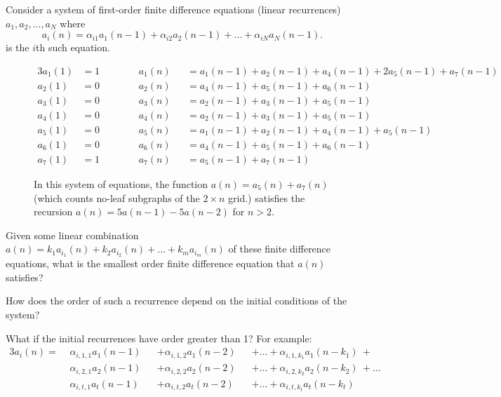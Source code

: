 \documentclass{article}
\begin{document}
Consider a system of first-order finite difference equations (linear recurrences)
$a_1, a_2, \hdots, a_N$ where \[
  a_i(n) = \alpha_{i1}a_1(n - 1) + \alpha_{i2}a_2(n - 1) + \hdots + \alpha_{iN}a_N(n - 1).
\] is the $i$th such equation.
%
\begin{figure}[ht!]
  \centering
  \begin{alignat*}{3}
    a_1(1) &= 1 \hspace{1cm} && a_1(n) &&= a_1(n - 1) + a_2(n - 1) + a_4(n - 1) + 2a_5(n - 1) + a_7(n - 1) \\
    a_2(1) &= 0 \hspace{1cm} && a_2(n) &&= a_4(n - 1) + a_5(n - 1) + a_6(n - 1) \\
    a_3(1) &= 0 \hspace{1cm} && a_3(n) &&= a_2(n - 1) + a_3(n - 1) + a_5(n - 1) \\
    a_4(1) &= 0 \hspace{1cm} && a_4(n) &&= a_2(n - 1) + a_3(n - 1) + a_5(n - 1) \\
    a_5(1) &= 0 \hspace{1cm} && a_5(n) &&= a_1(n - 1) + a_2(n - 1) + a_4(n - 1) + a_5(n - 1) \\
    a_6(1) &= 0 \hspace{1cm} && a_6(n) &&= a_4(n - 1) + a_5(n - 1) + a_6(n - 1) \\
    a_7(1) &= 1 \hspace{1cm} && a_7(n) &&= a_5(n - 1) + a_7(n - 1)
  \end{alignat*}
  \caption{
    In this system of equations, the function $a(n) = a_5(n) + a_7(n)$
    (which counts no-leaf subgraphs of the $2 \times n$ grid.)
    satisfies the recursion $a(n) = 5a(n-1) - 5a(n-2)$ for $n > 2$.
  }
\end{figure}
\begin{question}
  Given some linear combination
    $a(n) = k_1a_{i_1}(n) + k_2a_{i_2}(n) + \hdots + k_ma_{i_m}(n)$
  of these finite difference equations,
  what is the smallest order finite difference equation that $a(n)$ satisfies?
\end{question}

\begin{related}
  \item How does the order of such a recurrence depend on the initial conditions
    of the system?
  \item What if the initial recurrences have order greater than 1?
  For example:
  \begin{alignat*}{3}
    a_i(n) = \,\,
    & \alpha_{i,1,1}a_1(n - 1) &&+ \alpha_{i,1,2}a_1(n - 2) &&+ \hdots + \alpha_{i,1,k_1}a_1(n - k_1)\ + \\
    & \alpha_{i,2,1}a_2(n - 1) &&+ \alpha_{i,2,2}a_2(n - 2) &&+ \hdots + \alpha_{i,2,k_2}a_2(n - k_2)\ + \hdots \\
    & \alpha_{i,t,1}a_t(n - 1) &&+ \alpha_{i,t,2}a_t(n - 2) &&+ \hdots + \alpha_{i,t,k_t}a_t(n - k_t)
  \end{alignat*}
\end{related}
\end{document}
